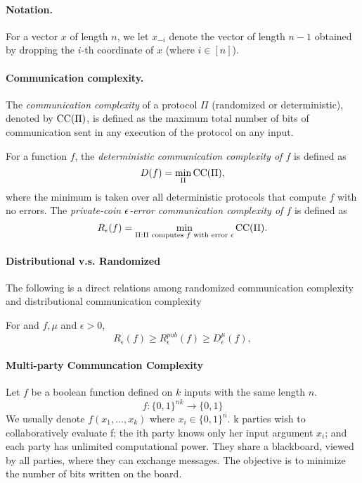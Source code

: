 \paragraph{Notation.}
For a vector $x$ of length $n$, we let $x_{-i}$ denote the vector of length $n-1$ obtained by dropping the $i$-th coordinate of $x$ (where $i \in [n]$).

\paragraph{Communication complexity.}
The \emph{communication complexity} of a protocol $\Pi$ (randomized or deterministic), denoted by $\mathrm{CC}(\Pi)$, is defined as the maximum total number of bits of communication
sent in any execution of the protocol on any input.

For a function $f$, the \emph{deterministic communication complexity of $f$} is defined as
\begin{equation*}
	D(f) = \min_{\Pi} \mathrm{CC}(\Pi),
\end{equation*}
where the minimum is taken over all deterministic protocols that compute $f$ with no errors. The \emph{private-coin $\epsilon$-error communication complexity of $f$} is defined as
\begin{equation*}
	R_\epsilon(f) = \min_{\Pi : \text{$\Pi$ computes $f$ with error $\epsilon$}} \mathrm{CC}(\Pi).
\end{equation*}

\paragraph{Distributional v.s. Randomized}
The following is a direct relations among randomized communication complexity and distributional communication complexity
\begin{theorem}
For and $f, \mu$ and $\epsilon > 0$,
\begin{equation*}
	R_{\epsilon}(f)\geq R^{pub}_{\epsilon}(f)\geq D^{\mu}_{\epsilon}(f),
\end{equation*}
\end{theorem}

\paragraph{Multi-party Communcation Complexity}
Let $f$ be a boolean function defined on $k$ inputs with the same length $n$.
\begin{equation*}
    f: \{0, 1\}^{nk} \rightarrow \{0, 1\}
\end{equation*}
We usually denote $f(x_1, ... , x_k)$ where $x_i \in \{0, 1\}^{n}$. \newline
k parties wish to collaboratively evaluate f; the ith party knows only her input argument $x_i$; and each party has unlimited computational power. They share a blackboard, viewed by all parties, where they can exchange messages. The objective is to minimize the number of bits written on the board.